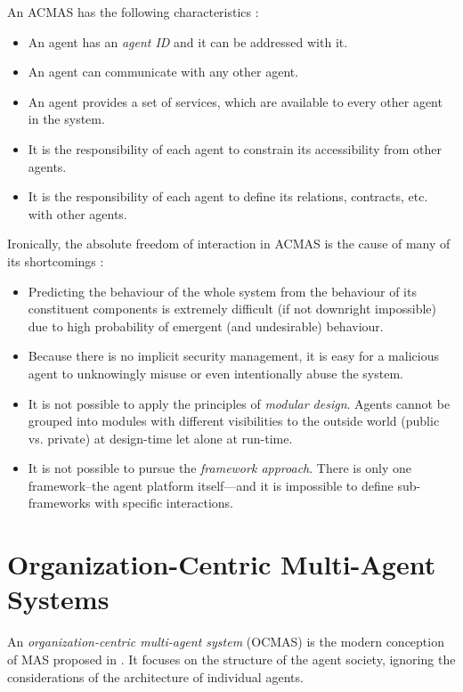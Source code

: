 An ACMAS has the following characteristics \cite{Ferber03}:
\begin{itemize}
	\item An agent has an \textit{agent ID} and it can be addressed with it.
	\item An agent can communicate with any other agent.
	\item An agent provides a set of services, which are available to every other agent in the system.
	\item It is the responsibility of each agent to constrain its accessibility from other agents.
	\item It is the responsibility of each agent to define its relations, contracts, etc. with other agents.
\end{itemize}

Ironically, the absolute freedom of interaction in ACMAS is the cause of many of its shortcomings \cite{Ferber03}:
\begin{itemize}
	\item Predicting the behaviour of the whole system from the behaviour of its constituent components is extremely difficult (if not downright impossible) due to high probability of emergent (and undesirable) behaviour.
	\item Because there is no implicit security management, it is easy for a malicious agent to unknowingly misuse or even intentionally abuse the system.
	\item It is not possible to apply the principles of \textit{modular design}. Agents cannot be grouped into modules with different visibilities to the outside world (public vs. private) at design-time let alone at run-time.
	\item It is not possible to pursue the \textit{framework approach}. There is only one framework--the agent platform itself---and it is impossible to define sub-frameworks with specific interactions.
\end{itemize}

\section{Organization-Centric Multi-Agent Systems}

An \textit{organization-centric multi-agent system} (OCMAS) is the modern conception of MAS proposed in \cite{Ferber03}.
It focuses on the structure of the agent society, ignoring the considerations of the architecture of individual agents.

